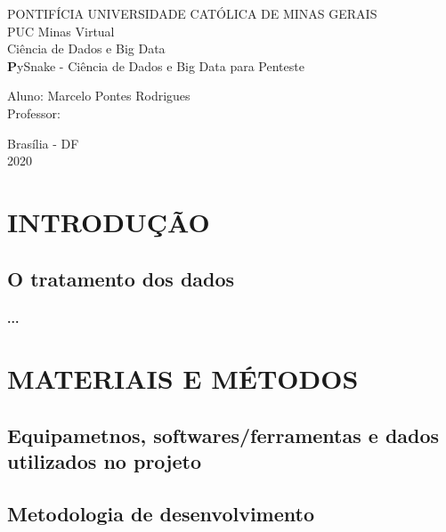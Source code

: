 \documentclass[a4paper, 12pt]{article}
\begin{document}
\begin{titlepage} %
\begin{center} %
{\large PONTIFÍCIA UNIVERSIDADE CATÓLICA DE MINAS GERAIS}\\[0.2cm] %
{\large PUC Minas Virtual}\\[0.2cm] %
{\large Ciência de Dados e Big Data}\\[5.1cm]
{\textbf PySnake - Ciência de Dados e Big Data para Penteste}\\[5.1cm] %
\end{center} %
{\large Aluno: Marcelo Pontes Rodrigues}\\[0.7cm] %
{\large Professor:}\\[5.1cm]
\begin{center}
{\large Brasília - DF}\\[0.2cm]
{\large 2020}
\end{center}
\end{titlepage} %
\pagebreak[1]

\section{INTRODUÇÃO}
	\subsection{O tratamento dos dados}
		\paragraph{...}

\section{MATERIAIS E MÉTODOS}
	\subsection{Equipametnos, softwares/ferramentas e dados utilizados no projeto}
	\subsection{Metodologia de desenvolvimento}
\end{document}
